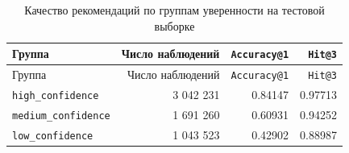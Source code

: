 \begin{center}
\small
\begin{longtable}{p{} r r r}
\caption{Качество рекомендаций по группам уверенности на тестовой выборке}
\label{tab:confidence-groups}\\
\toprule
Группа & Число наблюдений & \texttt{Accuracy@1} & \texttt{Hit@3} \\
\midrule
\endfirsthead

\toprule
Группа & Число наблюдений & \texttt{Accuracy@1} & \texttt{Hit@3} \\
\midrule
\endhead

\bottomrule
\endlastfoot

\texttt{high\_confidence} & 3 042 231 & 0.84147 & 0.97713 \\
\texttt{medium\_confidence} & 1 691 260 & 0.60931 & 0.94252 \\
\texttt{low\_confidence} & 1 043 523 & 0.42902 & 0.88987 \\

\end{longtable}
\end{center}
